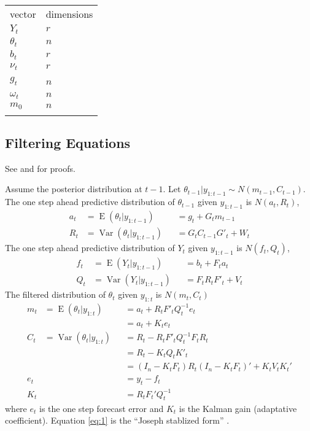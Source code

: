 \documentclass{article}\usepackage[]{graphicx}\usepackage[]{color}
\DeclareMathOperator{\E}{E}
\DeclareMathOperator{\Var}{Var}
\begin{document}
\begin{table}
  \centering
  \begin{tabular}[c]{@{}ll@{}}
    \hline\noalign{\medskip}
    vector & dimensions
    \\\noalign{\medskip}
    \hline\noalign{\medskip}
    $Y_t$ & $r$
    \\\noalign{\medskip}
    $\theta_t$ & $n$
    \\\noalign{\medskip}
    $b_t$ & $r$
    \\\noalign{\medskip}
    $\nu_t$ & $r$
    \\\noalign{\medskip}
    $g_t$ & $n$\
    \\\noalign{\medskip}
    $\omega_t$ & $n$
    \\\noalign{\medskip}
    $m_0$ & $n$
    \\\noalign{\medskip}
    \hline
  \end{tabular}
\end{table}


\subsection{Filtering Equations}

See \textcite[Chapter 2.7, p. 53]{PetrisPetroneEtAl2009} and \textcite[Chapter 4]{WestHarrison1997} for proofs.

Assume the posterior distribution at $t-1$. 
Let $\theta_{t-1} | y_{1:t-1} \sim N(m_{t-1}, C_{t-1})$.
The one step ahead predictive distribution of $\theta_{t-1}$ given $y_{1:t-1}$ is $N(a_{t}, R_{t})$,
\begin{align}
  a_{t} &= \E(\theta_{t} | y_{1:t-1}) &&= g_{t} + G_{t} m_{t-1} \\
  R_{t} &= \Var(\theta_{t} | y_{1:t-1}) &&= G_{t} C_{t-1} G'_{t} + W_{t}
\end{align}
The one step ahead predictive distribution of $Y_{t}$ given $y_{1:t-1}$ is $N(f_{t}, Q_{t})$,
\begin{align}
  f_{t} &= \E(Y_{t} | y_{1:t-1}) &&= b_{t} + F_{t} a_{t} \\
  Q_{t} &= \Var(Y_{t} | y_{1:t-1}) &&= F_{t} R_{t} F'_{t} + V_{t}
\end{align}
The filtered distribution of $\theta_{t}$ given $y_{1:t}$ is $N(m_{t}, C_{t})$
\begin{align}
  \label{eq:5}
  m_{t} &= \E(\theta_{t} | y_{1:t}) &&= a_{t} + R_{t} F'_{t} Q_{t}^{-1} e_{t} \\
  &&& = a_{t} + K_{t} e_{t} \\
  \label{eq:6}
  C_{t} &= \Var(\theta_{t} | y_{1:t}) &&= R_{t} - R_{t} F'_{t} Q_{t}^{-1} F_{t} R_{t} \\
  &&& = R_{t} - K_{t} Q_{t} K'_{t} \\
  \label{eq:1}  
  &&& = (I_{n} - K_{t} F_{t}) R_{t} (I_{n} - K_{t} F_{t})' + K_{t} V_{t} K_{t}' \\
  e_{t} &&&= y_{t} - f_{t} \\
  K_{t} &&&= R_{t} F_{t}' Q_{t}^{-1}
\end{align}
where $e_{t}$ is the one step forecast error and $K_{t}$ is the Kalman gain (adaptative coefficient).
Equation \ref{eq:1} is the ``Joseph stablized form'' \parencite[3]{Tusell2011}.
\end{document}
